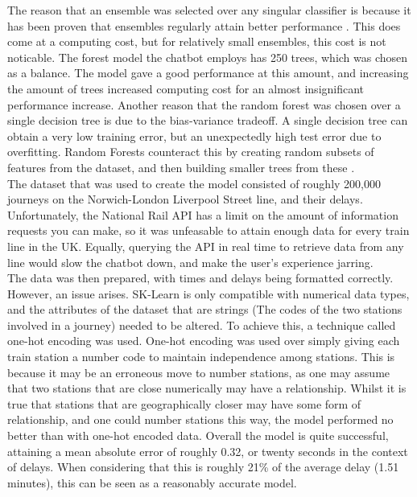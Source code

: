 \documentclass[12pt,a4paper]{article}
\begin{document}
    The reason that an ensemble was selected over any singular classifier is because it has been proven that ensembles regularly attain better performance \citep{Dietterich2000}. This does come at a computing cost, but for relatively small ensembles, this cost is not noticable. The forest model the chatbot employs has 250 trees, which was chosen as a balance. The model gave a good performance at this amount, and increasing the amount of trees increased computing cost for an almost insignificant performance increase. Another reason that the random forest was chosen over a single decision tree is due to the bias-variance tradeoff. A single decision tree can obtain a very low training error, but an unexpectedly high test error due to overfitting. Random Forests counteract this by creating random subsets of features from the dataset, and then building smaller trees from these \citep{Breiman2001}. \\
    
    The dataset that was used to create the model consisted of roughly 200,000 journeys on the Norwich-London Liverpool Street line, and their delays. Unfortunately, the National Rail API has a limit on the amount of information requests you can make, so it was unfeasable to attain enough data for every train line in the UK. Equally, querying the API in real time to retrieve data from any line would slow the chatbot down, and make the user's experience jarring. \\
    
    The data was then prepared, with times and delays being formatted correctly. However, an issue arises. SK-Learn is only compatible with numerical data types, and the attributes of the dataset that are strings (The codes of the two stations involved in a journey) needed to be altered. To achieve this, a technique called one-hot encoding was used. One-hot encoding was used over simply giving each train station a number code to maintain independence among stations. This is because it may be an erroneous move to number stations, as one may assume that two stations that are close numerically may have a relationship. Whilst it is true that stations that are geographically closer may have some form of relationship, and one could number stations this way, the model performed no better than with one-hot encoded data. Overall the model is quite successful, attaining a mean absolute error of roughly 0.32, or twenty seconds in the context of delays. When considering that this is roughly 21\% of the average delay (1.51 minutes), this can be seen as a reasonably accurate model.  
    
\end{document}
